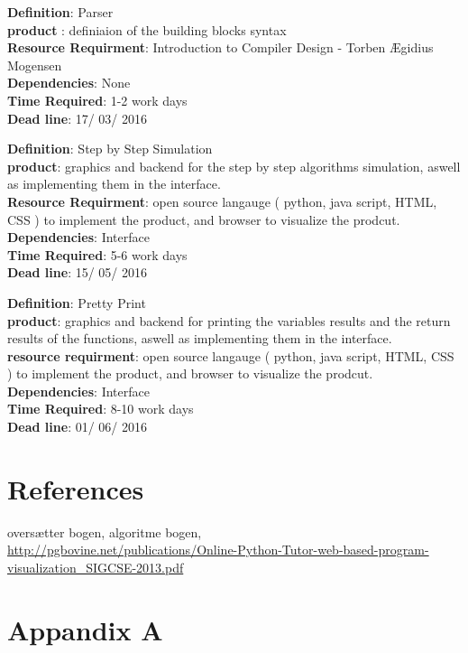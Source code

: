 \documentclass[11pt]{article}
\begin{document}
\textbf{Definition}:  Parser \\
\textbf{product} : definiaion of the building blocks syntax\\
\textbf{Resource Requirment}: Introduction to Compiler Design - Torben Ægidius Mogensen\\
\textbf{Dependencies}: None\\
\textbf{Time Required}: 1-2 work days\\
\textbf{Dead line}: 17/ 03/ 2016\\
\noindent\makebox[\linewidth]{\rule{\paperwidth}{0.4pt}}

\textbf{Definition}:  Step by Step Simulation\\
\textbf{product}: graphics and backend for the step by step  algorithms simulation, aswell as implementing them in the interface.\\
\textbf{Resource Requirment}: open source langauge ( python, java script, HTML, CSS ) to implement the product, and browser to visualize the prodcut. \\
\textbf{Dependencies}: Interface\\
\textbf{Time Required}: 5-6 work days\\
\textbf{Dead line}: 15/ 05/ 2016\\
\noindent\makebox[\linewidth]{\rule{\paperwidth}{0.4pt}}

\textbf{Definition}:  Pretty Print\\
\textbf{product}: graphics and backend for printing the variables results and the return results of the functions, aswell as implementing them in the interface.\\
\textbf{resource requirment}: open source langauge ( python, java script, HTML, CSS ) to implement the product, and browser to visualize the prodcut. \\
\textbf{Dependencies}: Interface\\
\textbf{Time Required}: 8-10 work days\\
\textbf{Dead line}: 01/ 06/ 2016\\

\section{References}
oversætter bogen, algoritme bogen,\\
\url{http://pgbovine.net/publications/Online-Python-Tutor-web-based-program-visualization\_SIGCSE-2013.pdf}


\newpage
\section{Appandix A}
\end{document}
